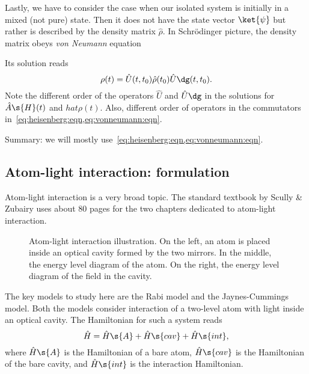 \documentclass[fontsize=9pt,bookmarkpackage=false]{scrartcl}
\renewcommand{\hbar}{\hslash}
\newcommand{\inputtikz}[1]{%
  \tikzsetnextfilename{#1}%
}
\newcommand*{\mybx}[1]{\colorbox{mygr!15}{\hspace{1em}#1\hspace{1em}}}
\begin{document}
Lastly, we have to consider the case when our isolated system is initially in a mixed (not pure) state.
Then it does not have the state vector $\ket{ \psi }$ but rather is described by the density matrix $\hat \rho$.
In Schrödinger picture, the density matrix obeys \emph{von Neumann} equation
Its solution reads
\begin{equation}
  \rho (t) = \hat U (t, t_0 ) \hat \rho (t_0) \hat U \dg (t, t_0).
\end{equation}
Note the different order of the operators $\hat U$ and $\hat U\dg$ in the solutions for $\hat A\s{H} (t)$ and $hat \rho (t)$.
Also, different order of operators in the commutators in~\cref{eq:heisenberg:eqn,eq:vonneumann:eqn}.

Summary: we will mostly use~\cref{eq:heisenberg:eqn,eq:vonneumann:eqn}.

\subsection{Atom-light interaction: formulation} %
\label{sec:atom_light_interaction}

Atom-light interaction is a very broad topic.
The standard textbook by Scully \& Zubairy uses about 80 pages for the two chapters dedicated to atom-light interaction.

\begin{figure}[htb]%
  \centering
  \inputtikz{atom-cavity}
  \caption{Atom-light interaction illustration.
    On the left, an atom is placed inside an optical cavity formed by the two mirrors.
    In the middle, the energy level diagram of the atom.
  On the right, the energy level diagram of the field in the cavity.}
  \label{fig:atom:light:int}
\end{figure}%

The key models to study here are the Rabi model and the Jaynes-Cummings model.
Both the models consider interaction of a two-level atom with light inside an optical cavity.
The Hamiltonian for such a system reads
\begin{equation}
  \hat H = \hat H\s{A} + \hat H\s{cav} + \hat H\s{int},
\end{equation}
where $\hat H\s{A}$ is the Hamiltonian of a bare atom,
$\hat H\s{cav}$ is the Hamiltonian of the bare cavity, and $\hat H\s{int}$ is the interaction Hamiltonian.
\end{document}
